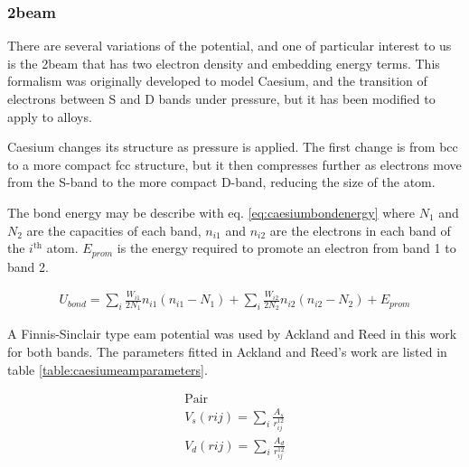 \subsubsection{\Acrlong{2beam}}

There are several variations of the  potential, and one of particular interest to us is the \acrlong{2beam} that has two electron density and embedding energy terms.  This formalism was originally developed to model Caesium\cite{twobandackland}, and the transition of electrons between S and D bands under pressure, but it has been modified to apply to alloys.

Caesium changes its structure as pressure is applied.  The first change is from \acrshort{bcc} to a more compact \acrshort{fcc} structure, but it then compresses further as electrons move from the S-band to the more compact D-band, reducing the size of the atom.

The bond energy may be describe with eq. \ref{eq:caesiumbondenergy} where $N_1$ and $N_2$ are the capacities of each band, $n_{i1}$ and $n_{i2}$ are the electrons in each band of the $i^{\text{th}}$ atom.  $E_{prom}$ is the energy required to promote an electron from band 1 to band 2.

\begin{equation}
\begin{split}
U_{bond} = \sum_i \frac{W_{i1}}{2N_1} n_{i1}(n_{i1} - N_1) + \sum_i \frac{W_{i2}}{2N_2} n_{i2}(n_{i2} - N_2) + E_{prom}
\end{split}
\label{eq:caesiumbondenergy}
\end{equation}

A Finnis-Sinclair type \acrshort{eam} potential was used by Ackland and Reed in this work for both bands.  The parameters fitted in Ackland and Reed's work are listed in table \ref{table:caesiumeamparameters}.  

\begin{equation}
\begin{split}
\text{Pair} \\
V_s(r{ij}) = \sum_i \frac{A_s}{r^{12}_{ij}} \\
V_d(r{ij}) = \sum_i \frac{A_d}{r^{12}_{ij}} \\
\end{split}
\label{eq:caesium2beampair}
\end{equation}


